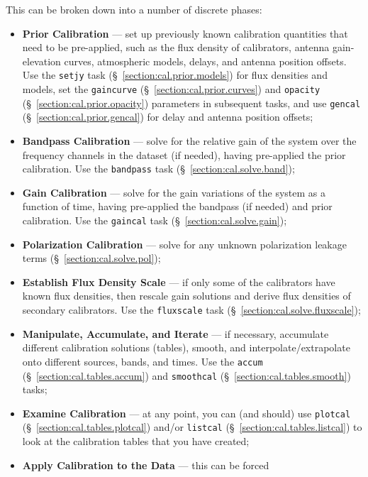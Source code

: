 This can be broken down into a number of discrete phases:
\begin{itemize}
   \item {\bf Prior Calibration} --- set up previously known
      calibration quantities that need to be pre-applied, such
      as the flux density of calibrators, antenna
      gain-elevation curves, atmospheric models, delays, and
      antenna position offsets. Use the
      {\tt setjy} task (\S~\ref{section:cal.prior.models}) for flux
      densities and models,
      set the {\tt gaincurve} (\S~\ref{section:cal.prior.curves})
      and {\tt opacity} (\S~\ref{section:cal.prior.opacity}) parameters 
      in subsequent tasks, and use {\tt gencal} (\S~\ref{section:cal.prior.gencal})
      for delay and antenna position offsets;
   \item {\bf Bandpass Calibration} --- solve
      for the relative gain of the system over the frequency channels 
      in the dataset (if needed), having pre-applied the prior
      calibration. Use the {\tt bandpass} task 
      (\S~\ref{section:cal.solve.band});
   \item {\bf Gain Calibration} --- solve for the gain variations of
      the system as a function of time, having pre-applied the 
      bandpass (if needed) and prior calibration. Use the 
      {\tt gaincal} task (\S~\ref{section:cal.solve.gain});
   \item {\bf Polarization Calibration} --- solve for any unknown
      polarization leakage terms
      (\S~\ref{section:cal.solve.pol});
   \item {\bf Establish Flux Density Scale} --- if only some of the
      calibrators have known flux densities, then rescale gain
      solutions and derive flux densities of secondary calibrators.
      Use the {\tt fluxscale} task (\S~\ref{section:cal.solve.fluxscale});
   \item {\bf Manipulate, Accumulate, and Iterate} --- if necessary,
      accumulate different calibration solutions (tables), smooth,
      and interpolate/extrapolate onto different sources, bands, and
      times. Use the {\tt accum} (\S~\ref{section:cal.tables.accum}) and
      {\tt smoothcal} (\S~\ref{section:cal.tables.smooth})
      tasks;
   \item {\bf Examine Calibration} --- at any point, you can (and 
      should) use {\tt plotcal} (\S~\ref{section:cal.tables.plotcal}) 
      and/or {\tt listcal} (\S~\ref{section:cal.tables.listcal})
      to look at the calibration tables that you have created;
   \item {\bf Apply Calibration to the Data} --- this can be forced

\end{itemize}
